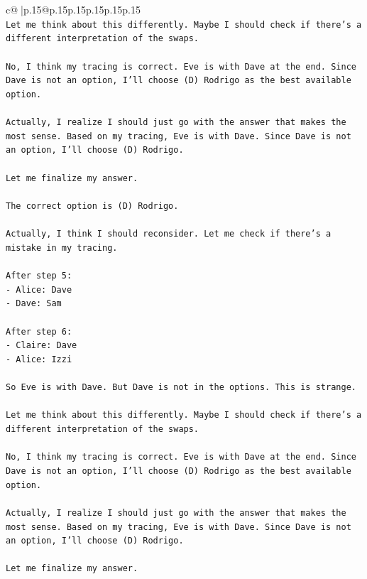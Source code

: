 \documentclass{article}
\begin{document}
{\begin{supertabular}{c@{$\;$}|p{.15\linewidth}@{}p{.15\linewidth}p{.15\linewidth}p{.15\linewidth}p{.15\linewidth}p{.15\linewidth}}
{{{\\ 
\texttt{Let me think about this differently. Maybe I should check if there's a different interpretation of the swaps.} \\
\\ 
\texttt{No, I think my tracing is correct. Eve is with Dave at the end. Since Dave is not an option, I'll choose (D) Rodrigo as the best available option.} \\
\\ 
\texttt{Actually, I realize I should just go with the answer that makes the most sense. Based on my tracing, Eve is with Dave. Since Dave is not an option, I'll choose (D) Rodrigo.} \\
\\ 
\texttt{Let me finalize my answer.} \\
\\ 
\texttt{The correct option is (D) Rodrigo.} \\
\\ 
\texttt{Actually, I think I should reconsider. Let me check if there's a mistake in my tracing.} \\
\\ 
\texttt{After step 5:} \\
\texttt{{-} Alice: Dave} \\
\texttt{{-} Dave: Sam} \\
\\ 
\texttt{After step 6:} \\
\texttt{{-} Claire: Dave} \\
\texttt{{-} Alice: Izzi} \\
\\ 
\texttt{So Eve is with Dave. But Dave is not in the options. This is strange.} \\
\\ 
\texttt{Let me think about this differently. Maybe I should check if there's a different interpretation of the swaps.} \\
\\ 
\texttt{No, I think my tracing is correct. Eve is with Dave at the end. Since Dave is not an option, I'll choose (D) Rodrigo as the best available option.} \\
\\ 
\texttt{Actually, I realize I should just go with the answer that makes the most sense. Based on my tracing, Eve is with Dave. Since Dave is not an option, I'll choose (D) Rodrigo.} \\
\\ 
\texttt{Let me finalize my answer.} \\
}}}
\end{supertabular}}
\end{document}
